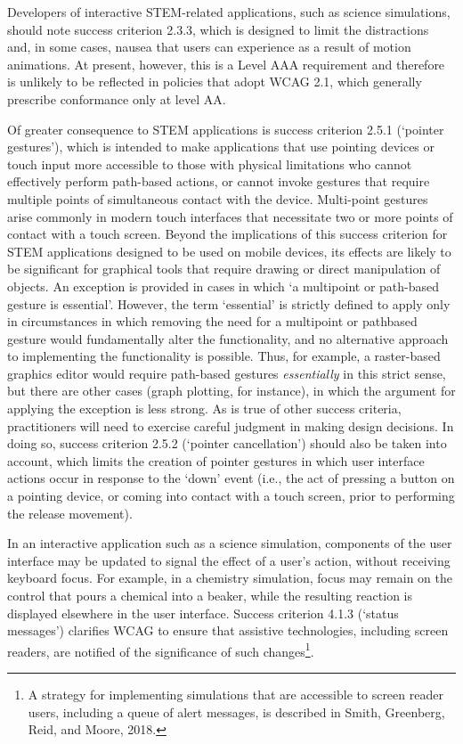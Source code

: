 \documentclass[11.5pt]{sig-alternate} %
\begin{document}
\begin{large}
Developers of interactive STEM-related applications, such as science simulations, should note success criterion 2.3.3, which is designed to limit the distractions and, in some cases, nausea that users can experience as a result of motion animations. At present, however, this is a Level AAA requirement and therefore is unlikely to be reflected in policies that adopt WCAG 2.1, which generally prescribe conformance only at level AA.

Of greater consequence to STEM applications is success criterion 2.5.1 (‘pointer gestures’), which is intended to make applications that use pointing devices or touch input more accessible to those with physical limitations who cannot effectively perform path-based actions, or cannot invoke gestures that require multiple points of simultaneous contact with the device. Multi-point gestures arise commonly in modern touch interfaces that necessitate two or more points of contact with a touch screen. Beyond the implications of this success criterion for STEM applications designed to be used on mobile devices, its effects are likely to be significant for graphical tools that require drawing or direct manipulation of objects. An exception is provided in cases in which ‘a multipoint or path-based gesture is essential’. However, the term ‘essential’ is strictly defined to apply only in circumstances in which removing the need for a multipoint or pathbased gesture would fundamentally alter the functionality, and no alternative approach to implementing the functionality is possible. Thus, for example, a raster-based graphics editor would require path-based gestures \textit{essentially} in this strict sense, but there are other cases (graph plotting, for instance), in which the argument for applying the exception is less strong. As is true of other success criteria, practitioners will need to exercise careful judgment in making design decisions. In doing so, success criterion 2.5.2 (‘pointer cancellation’) should also be taken into account, which limits the creation of pointer gestures in which user interface actions occur in response to the ‘down’ event (i.e., the act of pressing a button on a pointing device, or coming into contact with a touch screen, prior to performing the release movement).

In an interactive application such as a science simulation, components of the user interface may be updated to signal the effect of a user’s action, without receiving keyboard focus. For example, in a chemistry simulation, focus may remain on the control that pours a chemical into a beaker, while the resulting reaction is displayed elsewhere in the user interface. Success criterion 4.1.3 (‘status messages’) clarifies WCAG to ensure that assistive technologies, including screen readers, are notified of the significance of such changes\footnote{A strategy for implementing simulations that are accessible to screen reader users, including a queue of alert messages, is described in Smith, Greenberg, Reid, and Moore, 2018.}. 


\end{large}
\end{document}
